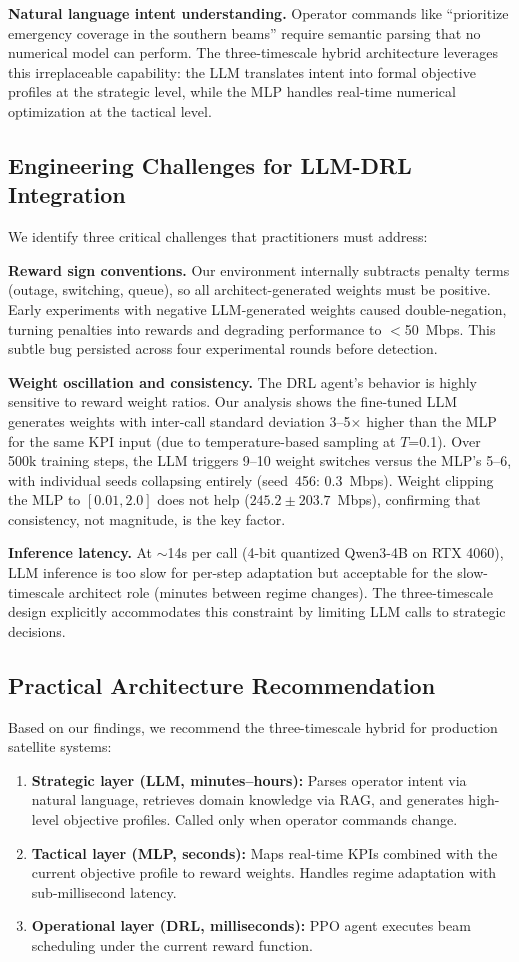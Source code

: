 \documentclass[conference]{IEEEtran}
\begin{document}
\textbf{Natural language intent understanding.} Operator commands like ``prioritize emergency coverage in the southern beams'' require semantic parsing that no numerical model can perform. The three-timescale hybrid architecture leverages this irreplaceable capability: the LLM translates intent into formal objective profiles at the strategic level, while the MLP handles real-time numerical optimization at the tactical level.

\subsection{Engineering Challenges for LLM-DRL Integration}
We identify three critical challenges that practitioners must address:

\textbf{Reward sign conventions.} Our environment internally subtracts penalty terms (outage, switching, queue), so all architect-generated weights must be positive. Early experiments with negative LLM-generated weights caused double-negation, turning penalties into rewards and degrading performance to $<$50~Mbps. This subtle bug persisted across four experimental rounds before detection.

\textbf{Weight oscillation and consistency.} The DRL agent's behavior is highly sensitive to reward weight ratios. Our analysis shows the fine-tuned LLM generates weights with inter-call standard deviation 3--5$\times$ higher than the MLP for the same KPI input (due to temperature-based sampling at $T$=0.1). Over 500k training steps, the LLM triggers 9--10 weight switches versus the MLP's 5--6, with individual seeds collapsing entirely (seed~456: 0.3~Mbps). Weight clipping the MLP to $[0.01, 2.0]$ does not help ($245.2\pm203.7$~Mbps), confirming that consistency, not magnitude, is the key factor.

\textbf{Inference latency.} At $\sim$14s per call (4-bit quantized Qwen3-4B on RTX 4060), LLM inference is too slow for per-step adaptation but acceptable for the slow-timescale architect role (minutes between regime changes). The three-timescale design explicitly accommodates this constraint by limiting LLM calls to strategic decisions.

\subsection{Practical Architecture Recommendation}
Based on our findings, we recommend the three-timescale hybrid for production satellite systems:
\begin{enumerate}
\item \textbf{Strategic layer (LLM, minutes--hours):} Parses operator intent via natural language, retrieves domain knowledge via RAG, and generates high-level objective profiles. Called only when operator commands change.
\item \textbf{Tactical layer (MLP, seconds):} Maps real-time KPIs combined with the current objective profile to reward weights. Handles regime adaptation with sub-millisecond latency.
\item \textbf{Operational layer (DRL, milliseconds):} PPO agent executes beam scheduling under the current reward function.
\end{enumerate}
\end{document}
